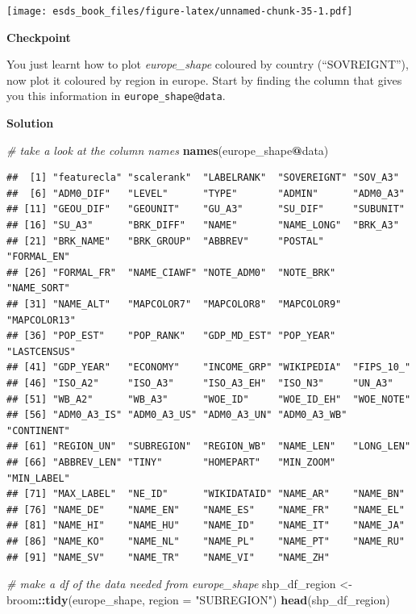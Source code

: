 \documentclass[
]{book}
\newenvironment{Shaded}{\begin{snugshade}}{\end{snugshade}}
\newcommand{\CommentTok}[1]{\textcolor[rgb]{0.56,0.35,0.01}{\textit{#1}}}
\newcommand{\DataTypeTok}[1]{\textcolor[rgb]{0.13,0.29,0.53}{#1}}
\newcommand{\KeywordTok}[1]{\textcolor[rgb]{0.13,0.29,0.53}{\textbf{#1}}}
\newcommand{\NormalTok}[1]{#1}
\newcommand{\OperatorTok}[1]{\textcolor[rgb]{0.81,0.36,0.00}{\textbf{#1}}}
\newcommand{\StringTok}[1]{\textcolor[rgb]{0.31,0.60,0.02}{#1}}
\begin{document}
\texttt{[image: esds\_book\_files/figure-latex/unnamed-chunk-35-1.pdf]}

\textbf{Checkpoint}

You just learnt how to plot \emph{europe\_shape} coloured by country (``SOVREIGNT''), now plot it coloured by region in europe.
Start by finding the column that gives you this information in \texttt{europe\_shape@data}.

\textbf{Solution}

\begin{Shaded}
\begin{Highlighting}[]
\CommentTok{# take a look at the column names}
\KeywordTok{names}\NormalTok{(europe_shape}\OperatorTok{@}\NormalTok{data)}
\end{Highlighting}
\end{Shaded}

\begin{verbatim}
##  [1] "featurecla" "scalerank"  "LABELRANK"  "SOVEREIGNT" "SOV_A3"    
##  [6] "ADM0_DIF"   "LEVEL"      "TYPE"       "ADMIN"      "ADM0_A3"   
## [11] "GEOU_DIF"   "GEOUNIT"    "GU_A3"      "SU_DIF"     "SUBUNIT"   
## [16] "SU_A3"      "BRK_DIFF"   "NAME"       "NAME_LONG"  "BRK_A3"    
## [21] "BRK_NAME"   "BRK_GROUP"  "ABBREV"     "POSTAL"     "FORMAL_EN" 
## [26] "FORMAL_FR"  "NAME_CIAWF" "NOTE_ADM0"  "NOTE_BRK"   "NAME_SORT" 
## [31] "NAME_ALT"   "MAPCOLOR7"  "MAPCOLOR8"  "MAPCOLOR9"  "MAPCOLOR13"
## [36] "POP_EST"    "POP_RANK"   "GDP_MD_EST" "POP_YEAR"   "LASTCENSUS"
## [41] "GDP_YEAR"   "ECONOMY"    "INCOME_GRP" "WIKIPEDIA"  "FIPS_10_"  
## [46] "ISO_A2"     "ISO_A3"     "ISO_A3_EH"  "ISO_N3"     "UN_A3"     
## [51] "WB_A2"      "WB_A3"      "WOE_ID"     "WOE_ID_EH"  "WOE_NOTE"  
## [56] "ADM0_A3_IS" "ADM0_A3_US" "ADM0_A3_UN" "ADM0_A3_WB" "CONTINENT" 
## [61] "REGION_UN"  "SUBREGION"  "REGION_WB"  "NAME_LEN"   "LONG_LEN"  
## [66] "ABBREV_LEN" "TINY"       "HOMEPART"   "MIN_ZOOM"   "MIN_LABEL" 
## [71] "MAX_LABEL"  "NE_ID"      "WIKIDATAID" "NAME_AR"    "NAME_BN"   
## [76] "NAME_DE"    "NAME_EN"    "NAME_ES"    "NAME_FR"    "NAME_EL"   
## [81] "NAME_HI"    "NAME_HU"    "NAME_ID"    "NAME_IT"    "NAME_JA"   
## [86] "NAME_KO"    "NAME_NL"    "NAME_PL"    "NAME_PT"    "NAME_RU"   
## [91] "NAME_SV"    "NAME_TR"    "NAME_VI"    "NAME_ZH"
\end{verbatim}

\begin{Shaded}
\begin{Highlighting}[]
\CommentTok{# make a df of the data needed from europe_shape}
\NormalTok{shp_df_region <-}\StringTok{ }\NormalTok{broom}\OperatorTok{::}\KeywordTok{tidy}\NormalTok{(europe_shape, }\DataTypeTok{region =} \StringTok{"SUBREGION"}\NormalTok{)}
\KeywordTok{head}\NormalTok{(shp_df_region)}
\end{Highlighting}
\end{Shaded}
\end{document}
